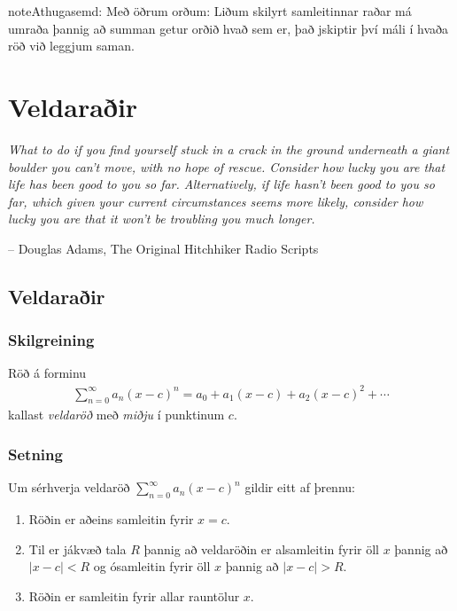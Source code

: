 \documentclass[b5paper,11pt,icelandic]{sphinxmanual}
\begin{document}
\begin{notice}{note}{Athugasemd:}
Með öðrum orðum:
Liðum skilyrt samleitinnar raðar má umraða þannig að summan getur orðið
hvað sem er, það jskiptir því máli í hvaða röð við leggjum saman.
\end{notice}


\chapter{Veldaraðir}
\label{kafli10:veldarair}\label{kafli10::doc}
\emph{What to do if you find yourself stuck in a crack in the ground underneath
a giant boulder you can't move, with no hope of rescue. Consider how lucky
you are that life has been good to you so far. Alternatively, if life hasn't
been good to you so far, which given your current circumstances seems more
likely, consider how lucky you are that it won't be troubling you much longer.}

-- Douglas Adams, The Original Hitchhiker Radio Scripts


\section{Veldaraðir}
\label{kafli10:id1}\label{kafli10:index-1}

\subsection{Skilgreining}
\label{kafli10:skilgreining}
Röð á forminu
\begin{equation*}
\begin{split}\sum_{n=0}^\infty a_n(x-c)^n=a_0+a_1(x-c)+a_2(x-c)^2+\cdots\end{split}
\end{equation*}
kallast \textit{veldaröð} með \textit{miðju} í punktinum \(c\).


\subsection{Setning}
\label{kafli10:setning-samleitnigeisli}\label{kafli10:setning}
Um sérhverja veldaröð \(\sum_{n=0}^\infty a_n(x-c)^n\) gildir eitt
af þrennu:
\begin{enumerate}
\item {} 
Röðin er aðeins samleitin fyrir \(x=c\).

\item {} 
Til er jákvæð tala \(R\) þannig að veldaröðin er alsamleitin
fyrir öll \(x\) þannig að \(|x-c|<R\) og ósamleitin fyrir
öll \(x\) þannig að \(|x-c|>R\).

\item {} 
Röðin er samleitin fyrir allar rauntölur \(x\).

\end{enumerate}
\end{document}
